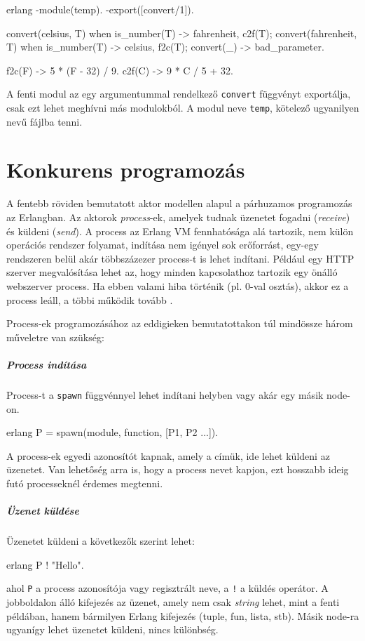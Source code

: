 \documentclass[12pt, a4paper, oneside]{book}
\begin{document}
\begin{code}{erlang}{}
-module(temp).
-export([convert/1]).

convert({celsius, T}) when is_number(T) ->
  {fahrenheit, c2f(T)};
convert({fahrenheit, T}) when is_number(T) ->
  {celsius, f2c(T)};
convert(_) ->
  bad_parameter.

f2c(F) ->
  5 * (F - 32) / 9.
c2f(C) ->
  9 * C / 5 + 32.
\end{code}

A fenti modul az egy argumentummal rendelkező \texttt{convert} függvényt
exportálja, csak ezt lehet meghívni más modulokból. A modul neve \texttt{temp},
kötelező ugyanilyen nevű fájlba tenni.

\section{Konkurens programozás}
A fentebb röviden bemutatott aktor modellen alapul a párhuzamos
programozás az Erlangban. Az aktorok \emph{process}-ek, amelyek tudnak üzenetet
fogadni (\emph{receive}) és küldeni (\emph{send}). A process az Erlang VM
fennhatósága alá tartozik, nem külön operációs rendszer folyamat, indítása nem
igényel sok erőforrást, egy-egy rendszeren belül akár többszázezer process-t
is lehet indítani. Például egy HTTP szerver megvalósítása lehet az, hogy minden
kapcsolathoz tartozik egy önálló webszerver process. Ha ebben valami hiba
történik (pl. 0-val osztás), akkor ez a process leáll, a többi működik tovább
\citep{CesariniBook}.

Process-ek programozásához az eddigieken bemutatottakon túl mindössze három
műveletre van szükség:

\subparagraph{Process indítása} Process-t a \texttt{spawn} függvénnyel lehet
indítani helyben vagy akár egy másik node-on.
\begin{code}{erlang}{}
 P = spawn(module, function, [P1, P2 ...]).
\end{code}

\noindent A process-ek egyedi azonosítót kapnak, amely a címük, ide lehet
küldeni az üzenetet. Van lehetőség arra is, hogy a process nevet kapjon, ezt
hosszabb ideig futó processeknél érdemes megtenni.

\subparagraph{Üzenet küldése} Üzenetet küldeni a következők szerint lehet:
\begin{code}{erlang}{}
          P ! "Hello". 
\end{code} 
\noindent ahol \texttt{P} a process azonosítója vagy regisztrált
neve, a \texttt{!} a küldés operátor. A jobboldalon álló kifejezés az üzenet,
amely nem csak \emph{string} lehet, mint a fenti példában, hanem bármilyen Erlang
kifejezés (tuple, fun, lista, stb). Másik node-ra ugyanígy lehet üzenetet
küldeni, nincs különbség.
\end{document}

